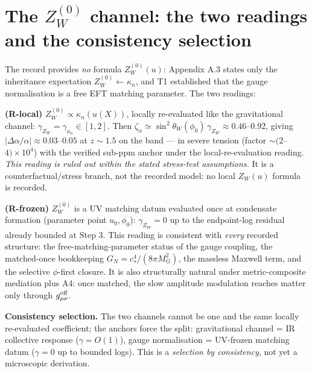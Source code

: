 \documentclass[11pt,a4paper]{article}
\begin{document}
\section{The $Z_W^{(0)}$ channel: the two readings and the consistency
selection}
The record provides \emph{no} formula $Z_W^{(0)}(u)$: Appendix A.3 states only
the inheritance expectation $Z_W^{(0)}\!\leftarrow\!\kappa_n$, and T1
established that the gauge normalisation is a free EFT matching parameter.
The two readings:

\textbf{(R-local)} $Z_W^{(0)}\propto\kappa_n(u(X))$, locally re-evaluated like
the gravitational channel: $\gamma_{Z_W}=\gamma_{\kappa_n}\in[1,2]$. Then
$\zeta_\alpha\simeq\sin^2\!\theta_W(\phi_0)\,\gamma_{Z_W}\approx0.46$--$0.92$,
giving $|\Delta\alpha/\alpha|\approx0.03$--$0.05$ at $z\sim1.5$ on the band ---
in severe tension (factor $\sim(2$--$4)\times10^{4}$) with the verified sub-ppm
anchor under the local-re-evaluation reading. \emph{This reading is ruled out
within the stated stress-test assumptions.} It is a counterfactual/stress
branch, not the recorded model: no local $Z_W(u)$ formula is recorded.

\textbf{(R-frozen)} $Z_W^{(0)}$ is a UV matching datum evaluated once at
condensate formation (parameter point $u_0,\phi_0$): $\gamma_{Z_W}=0$ up to the
endpoint-log residual already bounded at Step 3. This reading is consistent
with \emph{every} recorded structure: the free-matching-parameter status of the
gauge coupling, the matched-once bookkeeping $G_N=c_*^4/(8\pi M_G^2)$, the
massless Maxwell term, and the selective $\phi$-first closure. It is also
structurally natural under metric-composite mediation plus A4: once matched,
the slow amplitude modulation reaches matter only through
$g^{\rm eff}_{\mu\nu}$.

\textbf{Consistency selection.} The two channels cannot be one and the same
locally re-evaluated coefficient; the anchors force the split: gravitational
channel = IR collective response ($\gamma=O(1)$), gauge normalisation =
UV-frozen matching datum ($\gamma=0$ up to bounded logs). This is a
\emph{selection by consistency}, not yet a microscopic derivation.
\end{document}
